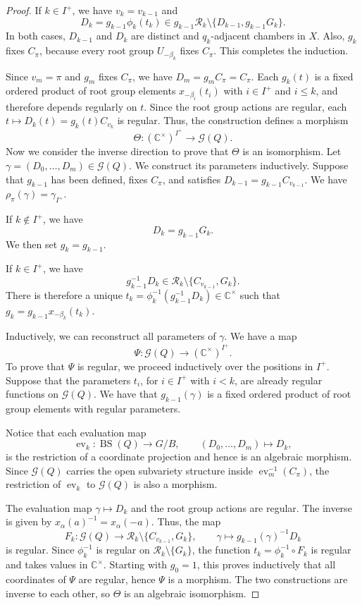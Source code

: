 \documentclass[11pt,a4paper]{article}
\theoremstyle{definition}
\theoremstyle{remark}
\numberwithin{equation}{section}
\newcommand{\C}{\mathbb C}
\begin{document}
\begin{proof}
If $k\in I^+$, we have $v_k=v_{k-1}$ and
\[
 D_k=g_{k-1}\phi_k(t_k)
 \in g_{k-1}\mathcal R_k
 \setminus\{D_{k-1},g_{k-1}G_k\}.
\]
In both cases, $D_{k-1}$ and $D_k$ are distinct and
$q_k$-adjacent chambers in $X$. Also, $g_k$ fixes $C_\pi$, because every root group $U_{-\beta_k}$ fixes $C_\pi$. This completes the induction.

Since $v_m=\pi$ and $g_m$ fixes $C_\pi$, we have
$D_m=g_mC_\pi=C_\pi$.
Each $g_k(t)$ is a fixed ordered product of root group
elements $x_{-\beta_i}(t_i)$ with $i\in I^+$ and $i\leq k$,
and therefore depends regularly on $t$.
Since the root group actions are regular, each
$t\mapsto D_k(t)=g_k(t)C_{v_k}$ is regular.
Thus, the construction defines a morphism
\[
\Theta:(\C^\times)^{I^+}\longrightarrow\mathcal G(Q).
\]
Now we consider the inverse direction to prove that $\Theta$ is an isomorphism. Let $\gamma=(D_0,\ldots,D_m)\in\mathcal G(Q)$.
We construct its parameters inductively. Suppose that
$g_{k-1}$ has been defined, fixes $C_\pi$, and satisfies
$D_{k-1}=g_{k-1}C_{v_{k-1}}$.
We have $\rho_\pi(\gamma)=\gamma_{I^+}$.

If $k\notin I^+$, we have
\[
 D_k=g_{k-1}G_k.
\]
We then set $g_k=g_{k-1}$.

If $k\in I^+$, we have
\[
 g_{k-1}^{-1}D_k
 \in\mathcal R_k\setminus\{C_{v_{k-1}},G_k\}.
\]
There is therefore a unique $t_k=\phi_k^{-1}(g_{k-1}^{-1}D_k)\in\C^\times$ such that $g_k=g_{k-1}x_{-\beta_k}(t_k)$.

Inductively, we can reconstruct all parameters of $\gamma$. We have a map
\[
 \Psi:\mathcal G(Q)\longrightarrow(\C^\times)^{I^+}.
\]
To prove that $\Psi$ is regular, we proceed inductively
over the positions in $I^+$. Suppose that the parameters $t_i$, for $i\in I^+$ with $i<k$, are already regular functions on $\mathcal G(Q)$.
We have that $g_{k-1}(\gamma)$ is a fixed ordered product of
root group elements with regular parameters.

Notice that each evaluation map
\[
\operatorname{ev}_k:\operatorname{BS}(Q)\longrightarrow G/B,
\qquad
(D_0,\ldots,D_m)\longmapsto D_k,
\]
is the restriction of a coordinate projection and hence is
an algebraic morphism. Since $\mathcal G(Q)$ carries the open subvariety structure inside $\operatorname{ev}_m^{-1}(C_\pi)$, the restriction of $\operatorname{ev}_k$ to $\mathcal G(Q)$ is also a morphism.

The evaluation map $\gamma\mapsto D_k$ and the root group actions are regular. The inverse is given by $x_\alpha(a)^{-1}=x_\alpha(-a)$.
Thus, the map
\[
F_k:\mathcal G(Q)\longrightarrow
\mathcal R_k\setminus\{C_{v_{k-1}},G_k\},
\qquad
\gamma\longmapsto g_{k-1}(\gamma)^{-1}D_k
\]
is regular. Since $\phi_k^{-1}$ is regular on
$\mathcal R_k\setminus\{G_k\}$, the function $t_k=\phi_k^{-1}\circ F_k$ is regular and takes values in $\C^\times$. Starting with $g_0=1$, this proves inductively that all coordinates of $\Psi$ are regular, hence $\Psi$ is a morphism. The two constructions are inverse to each other, so $\Theta$ is an algebraic isomorphism.


\end{proof}
\end{document}
